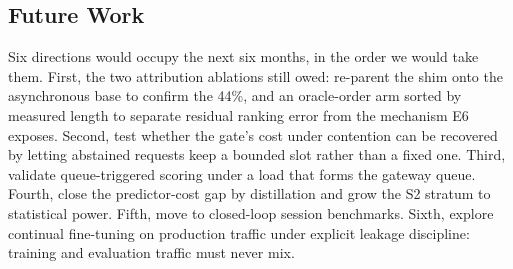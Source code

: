 \subsection{Future Work}
Six directions would occupy the next six months, in the order we would take
them. First, the two attribution ablations still owed: re-parent the shim onto
the asynchronous base to confirm the 44\%, and an oracle-order arm sorted by
measured length to separate residual ranking error from the mechanism E6
exposes. Second, test whether the gate's cost
under contention can be recovered by letting abstained requests keep a
bounded slot rather than a fixed one. Third, validate queue-triggered
scoring under a load that forms the gateway queue. Fourth, close the
predictor-cost gap by distillation and grow the S2 stratum to statistical
power. Fifth, move to closed-loop session benchmarks. Sixth, explore
continual fine-tuning on production traffic under explicit leakage
discipline: training and evaluation traffic must never mix.
